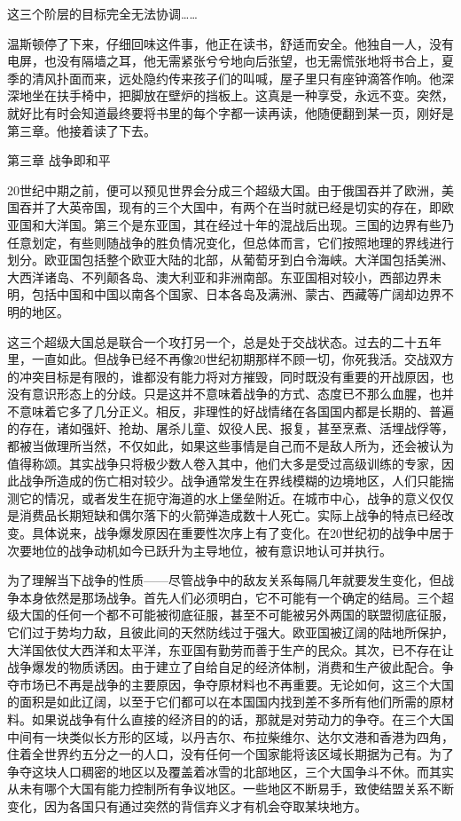 这三个阶层的目标完全无法协调\ldots\ldots{}

温斯顿停了下来，仔细回味这件事，他正在读书，舒适而安全。他独自一人，没有电屏，也没有隔墙之耳，他无需紧张兮兮地向后张望，也无需慌张地将书合上，夏季的清风扑面而来，远处隐约传来孩子们的叫喊，屋子里只有座钟滴答作响。他深深地坐在扶手椅中，把脚放在壁炉的挡板上。这真是一种享受，永远不变。突然，就好比有时会知道最终要将书里的每个字都一读再读，他随便翻到某一页，刚好是第三章。他接着读了下去。

第三章 战争即和平

20世纪中期之前，便可以预见世界会分成三个超级大国。由于俄国吞并了欧洲，美国吞并了大英帝国，现有的三个大国中，有两个在当时就已经是切实的存在，即欧亚国和大洋国。第三个是东亚国，其在经过十年的混战后出现。三国的边界有些乃任意划定，有些则随战争的胜负情况变化，但总体而言，它们按照地理的界线进行划分。欧亚国包括整个欧亚大陆的北部，从葡萄牙到白令海峡。大洋国包括美洲、大西洋诸岛、不列颠各岛、澳大利亚和非洲南部。东亚国相对较小，西部边界未明，包括中国和中国以南各个国家、日本各岛及满洲、蒙古、西藏等广阔却边界不明的地区。

这三个超级大国总是联合一个攻打另一个，总是处于交战状态。过去的二十五年里，一直如此。但战争已经不再像20世纪初期那样不顾一切，你死我活。交战双方的冲突目标是有限的，谁都没有能力将对方摧毁，同时既没有重要的开战原因，也没有意识形态上的分歧。只是这并不意味着战争的方式、态度已不那么血腥，也并不意味着它多了几分正义。相反，非理性的好战情绪在各国国内都是长期的、普遍的存在，诸如强奸、抢劫、屠杀儿童、奴役人民、报复，甚至烹煮、活埋战俘等，都被当做理所当然，不仅如此，如果这些事情是自己而不是敌人所为，还会被认为值得称颂。其实战争只将极少数人卷入其中，他们大多是受过高级训练的专家，因此战争所造成的伤亡相对较少。战争通常发生在界线模糊的边境地区，人们只能揣测它的情况，或者发生在扼守海道的水上堡垒附近。在城市中心，战争的意义仅仅是消费品长期短缺和偶尔落下的火箭弹造成数十人死亡。实际上战争的特点已经改变。具体说来，战争爆发原因在重要性次序上有了变化。在20世纪初的战争中居于次要地位的战争动机如今已跃升为主导地位，被有意识地认可并执行。

为了理解当下战争的性质------尽管战争中的敌友关系每隔几年就要发生变化，但战争本身依然是那场战争。首先人们必须明白，它不可能有一个确定的结局。三个超级大国的任何一个都不可能被彻底征服，甚至不可能被另外两国的联盟彻底征服，它们过于势均力敌，且彼此间的天然防线过于强大。欧亚国被辽阔的陆地所保护，大洋国依仗大西洋和太平洋，东亚国有勤劳而善于生产的民众。其次，已不存在让战争爆发的物质诱因。由于建立了自给自足的经济体制，消费和生产彼此配合。争夺市场已不再是战争的主要原因，争夺原材料也不再重要。无论如何，这三个大国的面积是如此辽阔，以至于它们都可以在本国国内找到差不多所有他们所需的原材料。如果说战争有什么直接的经济目的的话，那就是对劳动力的争夺。在三个大国中间有一块类似长方形的区域，以丹吉尔、布拉柴维尔、达尔文港和香港为四角，住着全世界约五分之一的人口，没有任何一个国家能将该区域长期据为己有。为了争夺这块人口稠密的地区以及覆盖着冰雪的北部地区，三个大国争斗不休。而其实从未有哪个大国有能力控制所有争议地区。一些地区不断易手，致使结盟关系不断变化，因为各国只有通过突然的背信弃义才有机会夺取某块地方。

